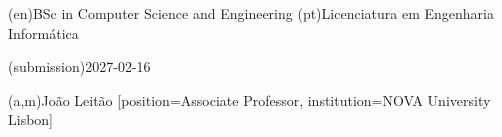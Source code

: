 %
%
%
\ntauthordegree(en){BSc in Computer Science and Engineering}
\ntauthordegree(pt){Licenciatura em Engenharia Informática}



%
%
\ntdate(submission){2027-02-16}



%
%
%
%
%
%
(a,m){João Leitão}
    [position=Associate Professor, institution=NOVA University Lisbon]





